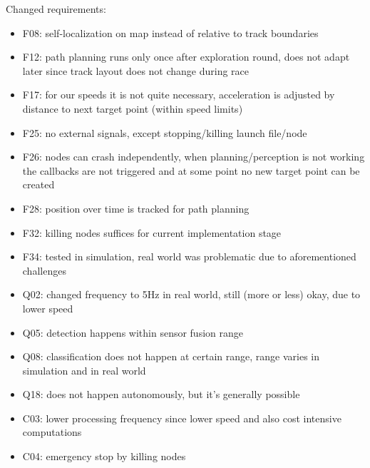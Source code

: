 Changed requirements:
\begin{itemize}
	\item F08: self-localization on map instead of relative to track boundaries
	\item F12: path planning runs only once after exploration round, does not adapt later since track layout does not change during race
	\item F17: for our speeds it is not quite necessary, acceleration is adjusted by distance to next target point (within speed limits)
	\item F25: no external signals, except stopping/killing launch file/node
	\item F26: nodes can crash independently, when planning/perception is not working the callbacks are not triggered and at some point no new target point can be created
	\item F28: position over time is tracked for path planning
	\item F32: killing nodes suffices for current implementation stage
	\item F34: tested in simulation, real world was problematic due to aforementioned challenges
	\item Q02: changed frequency to 5Hz in real world, still (more or less) okay, due to lower speed
	\item Q05: detection happens within sensor fusion range
	\item Q08: classification does not happen at certain range, range varies in simulation and in real world
	\item Q18: does not happen autonomously, but it's generally possible
	\item C03: lower processing frequency since lower speed and also cost intensive computations
	\item C04: emergency stop by killing nodes
\end{itemize}

